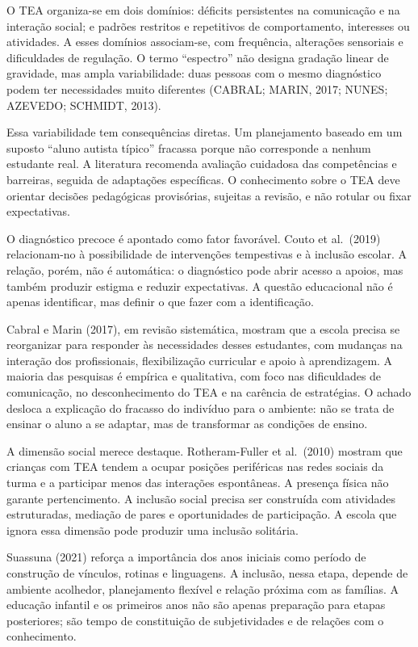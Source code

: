 O TEA organiza-se em dois domínios: déficits persistentes na comunicação
e na interação social; e padrões restritos e repetitivos de
comportamento, interesses ou atividades. A esses domínios associam-se,
com frequência, alterações sensoriais e dificuldades de regulação. O
termo ``espectro'' não designa gradação linear de gravidade, mas ampla
variabilidade: duas pessoas com o mesmo diagnóstico podem ter
necessidades muito diferentes (CABRAL; MARIN, 2017; NUNES; AZEVEDO;
SCHMIDT, 2013).

Essa variabilidade tem consequências diretas. Um planejamento baseado em
um suposto ``aluno autista típico'' fracassa porque não corresponde a
nenhum estudante real. A literatura recomenda avaliação cuidadosa das
competências e barreiras, seguida de adaptações específicas. O
conhecimento sobre o TEA deve orientar decisões pedagógicas provisórias,
sujeitas a revisão, e não rotular ou fixar expectativas.

O diagnóstico precoce é apontado como fator favorável. Couto et
al.~(2019) relacionam-no à possibilidade de intervenções tempestivas e à
inclusão escolar. A relação, porém, não é automática: o diagnóstico pode
abrir acesso a apoios, mas também produzir estigma e reduzir
expectativas. A questão educacional não é apenas identificar, mas
definir o que fazer com a identificação.

Cabral e Marin (2017), em revisão sistemática, mostram que a escola
precisa se reorganizar para responder às necessidades desses estudantes,
com mudanças na interação dos profissionais, flexibilização curricular e
apoio à aprendizagem. A maioria das pesquisas é empírica e qualitativa,
com foco nas dificuldades de comunicação, no desconhecimento do TEA e na
carência de estratégias. O achado desloca a explicação do fracasso do
indivíduo para o ambiente: não se trata de ensinar o aluno a se adaptar,
mas de transformar as condições de ensino.

A dimensão social merece destaque. Rotheram-Fuller et al.~(2010) mostram
que crianças com TEA tendem a ocupar posições periféricas nas redes
sociais da turma e a participar menos das interações espontâneas. A
presença física não garante pertencimento. A inclusão social precisa ser
construída com atividades estruturadas, mediação de pares e
oportunidades de participação. A escola que ignora essa dimensão pode
produzir uma inclusão solitária.

Suassuna (2021) reforça a importância dos anos iniciais como período de
construção de vínculos, rotinas e linguagens. A inclusão, nessa etapa,
depende de ambiente acolhedor, planejamento flexível e relação próxima
com as famílias. A educação infantil e os primeiros anos não são apenas
preparação para etapas posteriores; são tempo de constituição de
subjetividades e de relações com o conhecimento.

